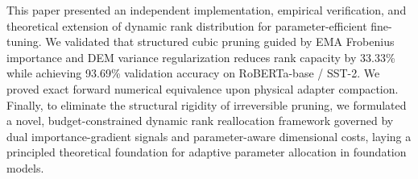 \documentclass[conference]{IEEEtran}
\begin{document}
This paper presented an independent implementation, empirical verification, and theoretical extension of dynamic rank distribution for parameter-efficient fine-tuning. We validated that structured cubic pruning guided by EMA Frobenius importance and DEM variance regularization reduces rank capacity by 33.33\% while achieving 93.69\% validation accuracy on RoBERTa-base / SST-2. We proved exact forward numerical equivalence upon physical adapter compaction. Finally, to eliminate the structural rigidity of irreversible pruning, we formulated a novel, budget-constrained dynamic rank reallocation framework governed by dual importance-gradient signals and parameter-aware dimensional costs, laying a principled theoretical foundation for adaptive parameter allocation in foundation models.



\end{document}
